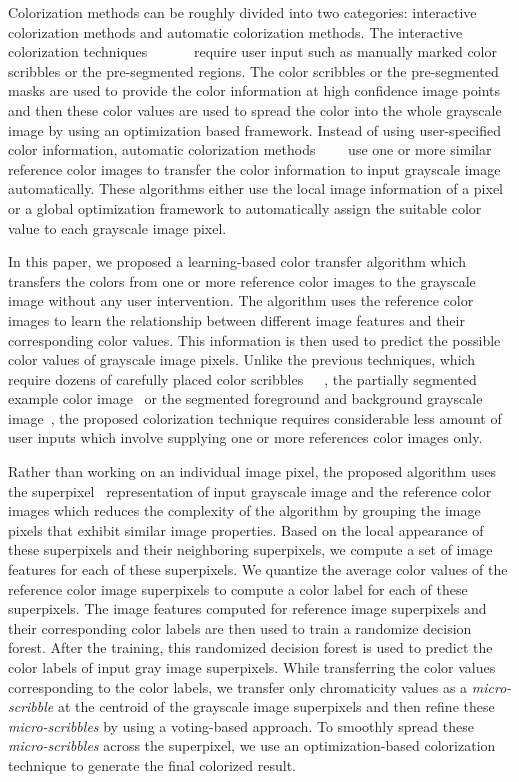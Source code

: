 \documentclass[twocolumn]{svjour3}          %
\begin{document}
Colorization methods can be roughly divided into two categories: interactive colorization methods and automatic colorization methods. The interactive colorization techniques~\cite{Levin04}~\cite{Irony05}~\cite{Huang05}~\cite{Yatziv06}~\cite{Luan07}~\cite{Alex11} require user input such as manually marked color scribbles or the pre-segmented regions. The color scribbles or the pre-segmented masks are used to provide the color information at high confidence image points and then these color values are used to spread the color into the whole grayscale image by using an optimization based framework. Instead of using user-specified color information, automatic colorization methods~\cite{Aaron01}~\cite{Welsh02}~\cite{Charpiat08}~\cite{Liu08} use one or more similar reference color images to transfer the color information to input grayscale image automatically. These algorithms either use the local image information of a pixel or a global optimization framework to automatically assign the suitable color value to each grayscale image pixel.

In this paper, we proposed a learning-based color transfer algorithm which transfers the colors from one or more reference color images to the grayscale image without any user intervention. The algorithm uses the reference color images to learn the relationship between different image features and their corresponding color values. This information is then used to predict the possible color values of grayscale image pixels.  Unlike the previous techniques, which require dozens of carefully placed color scribbles~\cite{Levin04}~\cite{Yatziv06}~\cite{Luan07}, the partially segmented example color image~\cite{Irony05} or the segmented foreground and background grayscale image~\cite{Alex11}, the proposed colorization technique requires considerable less amount of user inputs which involve supplying one or more references color images only.

Rather than working on an individual image pixel, the proposed algorithm uses the superpixel~\cite{Alex09} representation of input grayscale image and the reference color images which reduces the complexity of the algorithm by grouping the image pixels that exhibit similar image properties. Based on the local appearance of these superpixels and their neighboring superpixels, we compute a set of image features for each of these superpixels. We quantize the average color values of the reference color image superpixels to compute a color label for each of these superpixels. The image features computed for reference image superpixels and their corresponding color labels are then used to train a randomize decision forest. After the training, this randomized decision forest is used to predict the color labels of input gray image superpixels. While transferring the color values corresponding to the color labels, we transfer only chromaticity values as a \emph{micro-scribble} at the centroid of the grayscale image superpixels and then refine these \emph{micro-scribbles} by using a voting-based approach. To smoothly spread these \emph{micro-scribbles} across the superpixel, we use an optimization-based colorization technique to generate the final colorized result.
\end{document}
